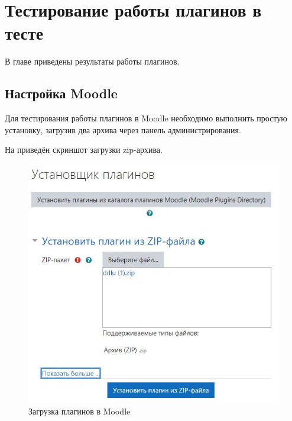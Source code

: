 \chapter{Тестирование работы плагинов в тесте} \label{ch4}

В главе приведены результаты работы плагинов.
	
\section{Настройка Moodle} \label{ch4:sec1}

Для тестирования работы плагинов в Moodle необходимо выполнить простую установку, загрузив два архива через панель администрирования.

На  приведён скриншот загрузки zip-архива.
\FloatBarrier %
\begin{figure}[ht] 
	\center
	\includegraphics [scale=0.6] {my_folder/images/zip}
	\caption{Загрузка плагинов в Moodle} 
	\label{fig:zip}  
\end{figure}
\FloatBarrier %

